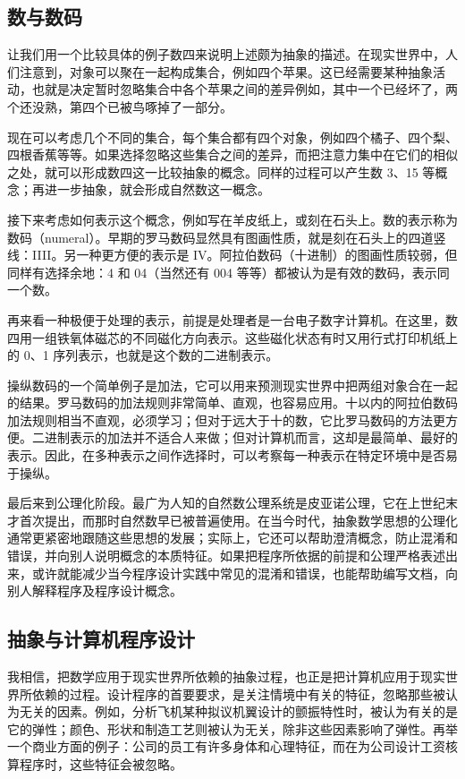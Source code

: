 \subsection{数与数码}
让我们用一个比较具体的例子\textemdash{}数四\textemdash{}来说明上述颇为抽象的描述。在现实世界中，人们注意到，对象可以聚在一起构成集合，例如四个苹果。这已经需要某种抽象活动，也就是决定暂时忽略集合中各个苹果之间的差异\textemdash{}例如，其中一个已经坏了，两个还没熟，第四个已被鸟啄掉了一部分。

现在可以考虑几个不同的集合，每个集合都有四个对象，例如四个橘子、四个梨、四根香蕉等等。如果选择忽略这些集合之间的差异，而把注意力集中在它们的相似之处，就可以形成数四这一比较抽象的概念。同样的过程可以产生数 3、15 等概念；再进一步抽象，就会形成自然数这一概念。

接下来考虑如何表示这个概念，例如写在羊皮纸上，或刻在石头上。数的表示称为数码（numeral）。早期的罗马数码显然具有图画性质，就是刻在石头上的四道竖线：IIII。另一种更方便的表示是 IV。阿拉伯数码（十进制）的图画性质较弱，但同样有选择余地：4 和 04（当然还有 004 等等）都被认为是有效的数码，表示同一个数。

再来看一种极便于处理的表示，前提是处理者是一台电子数字计算机。在这里，数四用一组铁氧体磁芯的不同磁化方向表示。这些磁化状态有时又用行式打印机纸上的 0、1 序列表示，也就是这个数的二进制表示。

操纵数码的一个简单例子是加法，它可以用来预测现实世界中把两组对象合在一起的结果。罗马数码的加法规则非常简单、直观，也容易应用。十以内的阿拉伯数码加法规则相当不直观，必须学习；但对于远大于十的数，它比罗马数码的方法更方便。二进制表示的加法并不适合人来做；但对计算机而言，这却是最简单、最好的表示。因此，在多种表示之间作选择时，可以考察每一种表示在特定环境中是否易于操纵。

最后来到公理化阶段。最广为人知的自然数公理系统是皮亚诺公理，它在上世纪末才首次提出，而那时自然数早已被普遍使用。在当今时代，抽象数学思想的公理化通常更紧密地跟随这些思想的发展；实际上，它还可以帮助澄清概念，防止混淆和错误，并向别人说明概念的本质特征。如果把程序所依据的前提和公理严格表述出来，或许就能减少当今程序设计实践中常见的混淆和错误，也能帮助编写文档，向别人解释程序及程序设计概念。

\subsection{抽象与计算机程序设计}

我相信，把数学应用于现实世界所依赖的抽象过程，也正是把计算机应用于现实世界所依赖的过程。设计程序的首要要求，是关注情境中有关的特征，忽略那些被认为无关的因素。例如，分析飞机某种拟议机翼设计的颤振特性时，被认为有关的是它的弹性；颜色、形状和制造工艺则被认为无关，除非这些因素影响了弹性。再举一个商业方面的例子：公司的员工有许多身体和心理特征，而在为公司设计工资核算程序时，这些特征会被忽略。

